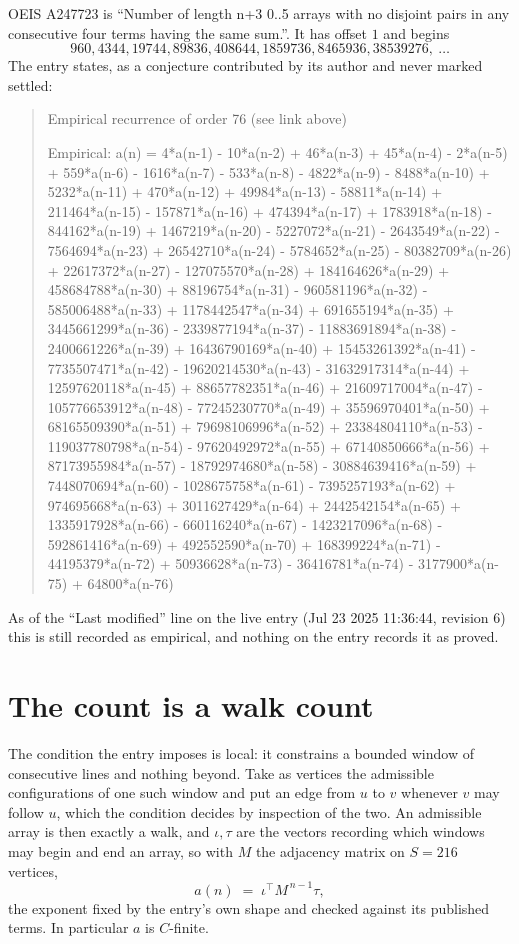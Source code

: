 \documentclass[11pt,a4paper]{article}
\theoremstyle{plain}
\theoremstyle{definition}
\begin{document}
OEIS A247723 is ``Number of length n+3 0..5 arrays with no disjoint pairs in any consecutive four terms having the same sum.''. It has offset $1$ and begins
\[
960, 4344, 19744, 89836, 408644, 1859736, 8465936, 38539276,\ \dots
\]
The entry states, as a conjecture contributed by its author and never marked settled:
\begin{quote}\raggedright\small
Empirical recurrence of order 76 (see link above)

Empirical: a(n) = 4*a(n-1) - 10*a(n-2) + 46*a(n-3) + 45*a(n-4) - 2*a(n-5) + 559*a(n-6) - 1616*a(n-7) - 533*a(n-8) - 4822*a(n-9) - 8488*a(n-10) + 5232*a(n-11) + 470*a(n-12) + 49984*a(n-13) - 58811*a(n-14) + 211464*a(n-15) - 157871*a(n-16) + 474394*a(n-17) + 1783918*a(n-18) - 844162*a(n-19) + 1467219*a(n-20) - 5227072*a(n-21) - 2643549*a(n-22) - 7564694*a(n-23) + 26542710*a(n-24) - 5784652*a(n-25) - 80382709*a(n-26) + 22617372*a(n-27) - 127075570*a(n-28) + 184164626*a(n-29) + 458684788*a(n-30) + 88196754*a(n-31) - 960581196*a(n-32) - 585006488*a(n-33) + 1178442547*a(n-34) + 691655194*a(n-35) + 3445661299*a(n-36) - 2339877194*a(n-37) - 11883691894*a(n-38) - 2400661226*a(n-39) + 16436790169*a(n-40) + 15453261392*a(n-41) - 7735507471*a(n-42) - 19620214530*a(n-43) - 31632917314*a(n-44) + 12597620118*a(n-45) + 88657782351*a(n-46) + 21609717004*a(n-47) - 105776653912*a(n-48) - 77245230770*a(n-49) + 35596970401*a(n-50) + 68165509390*a(n-51) + 79698106996*a(n-52) + 23384804110*a(n-53) - 119037780798*a(n-54) - 97620492972*a(n-55) + 67140850666*a(n-56) + 87173955984*a(n-57) - 18792974680*a(n-58) - 30884639416*a(n-59) + 7448070694*a(n-60) - 1028675758*a(n-61) - 7395257193*a(n-62) + 974695668*a(n-63) + 3011627429*a(n-64) + 2442542154*a(n-65) + 1335917928*a(n-66) - 660116240*a(n-67) - 1423217096*a(n-68) - 592861416*a(n-69) + 492552590*a(n-70) + 168399224*a(n-71) - 44195379*a(n-72) + 50936628*a(n-73) - 36416781*a(n-74) - 3177900*a(n-75) + 64800*a(n-76)
\end{quote}
As of the ``Last modified'' line on the live entry (Jul 23 2025 11:36:44, revision 6) this is still
recorded as empirical, and nothing on the entry records it as proved.

\section{The count is a walk count}

The condition the entry imposes is local: it constrains a bounded window of consecutive lines and nothing beyond. Take as vertices the admissible configurations of one such window and put an edge from $u$ to $v$ whenever $v$ may follow $u$, which the condition decides by inspection of the two.
An admissible array is then exactly a walk, and $\iota,\tau$ are the vectors recording which windows may begin and end an array, so with $M$ the adjacency matrix on $S=216$ vertices,
\[
a(n)\;=\;\iota^{\!\top}M^{\,n-1}\tau ,
\]
the exponent fixed by the entry's own shape and checked against its published terms. In
particular $a$ is $C$-finite.
\end{document}

